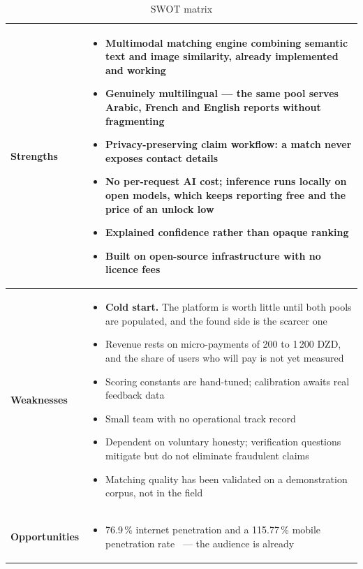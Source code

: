 \begin{table}[htbp]
\centering
\caption{SWOT matrix}
\label{tab:swot}
\small
\renewcommand{\arraystretch}{1.25}
\begin{tabularx}{\textwidth}{@{}>{\bfseries}p{2.75cm} >{\cellstartslist}X@{}}
\toprule
Strengths &
\begin{itemize}[leftmargin=1em,nosep,topsep=2pt]
  \item Multimodal matching engine combining semantic text and image similarity,
        already implemented and working
  \item Genuinely multilingual --- the same pool serves Arabic, French and
        English reports without fragmenting
  \item Privacy-preserving claim workflow: a match never exposes contact details
  \item No per-request AI cost; inference runs locally on open models, which
        keeps reporting free and the price of an unlock low
  \item Explained confidence rather than opaque ranking
  \item Built on open-source infrastructure with no licence fees
\end{itemize} \\
\midrule
Weaknesses &
\begin{itemize}[leftmargin=1em,nosep,topsep=2pt]
  \item \textbf{Cold start.} The platform is worth little until both pools are
        populated, and the found side is the scarcer one
  \item Revenue rests on micro-payments of 200 to 1\,200 DZD, and the share of
        users who will pay is not yet measured
  \item Scoring constants are hand-tuned; calibration awaits real feedback data
  \item Small team with no operational track record
  \item Dependent on voluntary honesty; verification questions mitigate but do
        not eliminate fraudulent claims
  \item Matching quality has been validated on a demonstration corpus, not in
        the field
\end{itemize} \\
\midrule
Opportunities &
\begin{itemize}[leftmargin=1em,nosep,topsep=2pt]
  \item 76.9\,\% internet penetration and a 115.77\,\% mobile penetration
        rate~\cite{datareportal2025,arpce2025} --- the audience is already

\end{itemize}
\end{tabularx}
\end{table}
